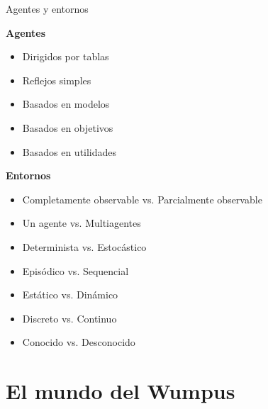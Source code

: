 \documentclass[11pt]{beamer}
\begin{document}
\begin{frame}{Agentes y entornos}

\begin{minipage}{0.43\linewidth}
\textbf{Agentes}

\begin{itemize}
\item Dirigidos por tablas
\item Reflejos simples
\item Basados en modelos
\item Basados en objetivos
\item Basados en utilidades
\end{itemize}
\vspace{3\baselineskip}\pause

\end{minipage}\begin{minipage}{0.57\linewidth}
\textbf{Entornos}

\begin{itemize}
\item Completamente observable vs. Parcialmente observable
\item Un agente vs. Multiagentes
\item Determinista vs. Estocástico
\item Episódico vs. Sequencial
\item Estático vs. Dinámico
\item Discreto vs. Continuo
\item Conocido vs. Desconocido
\end{itemize}
\end{minipage}
\end{frame}

\section{El mundo del Wumpus}
\end{document}
